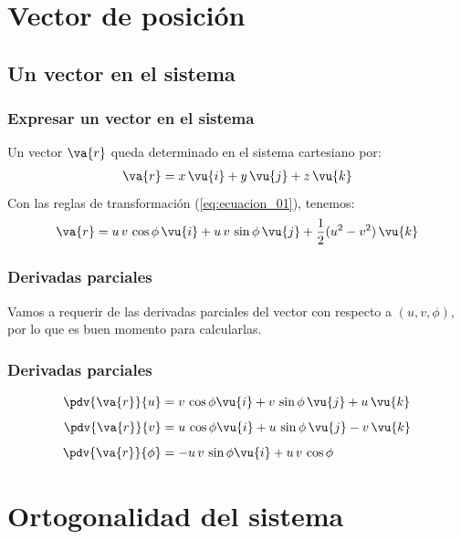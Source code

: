 \section{Vector de posición}
\subsection{Un vector en el sistema}
\begin{frame}
\frametitle{Expresar un vector en el sistema}
Un vector $\va{r}$ queda determinado en el sistema cartesiano por:
\begin{align*}
\va{r} = x \, \vu{i} + y \, \vu{j} + z \, \vu{k}
\end{align*}
\pause
Con las reglas de transformación (\ref{eq:ecuacion_01}), tenemos:
\begin{align*}
\va{r} = u \, v \, \cos \phi \, \vu{i} + u \, v \, \sin \phi \, \vu{j} + \dfrac{1}{2} (u^{2} - v^{2}) \, \vu{k}
\end{align*}
\end{frame}
\begin{frame}
\frametitle{Derivadas parciales}
Vamos a requerir de las derivadas parciales del vector con respecto a $(u, v, \phi)$, por lo que es buen momento para calcularlas.
\end{frame}
\begin{frame}
\frametitle{Derivadas parciales}
\begin{align}
\begin{aligned}
\pdv{\va{r}}{u} &= v \, \cos \phi \vu{i} + v \, \sin \phi \, \vu{j} + u \, \vu{k} \\[0.5em]
\pdv{\va{r}}{v} &= u \, \cos \phi \vu{i} + u \, \sin \phi \, \vu{j} - v \, \vu{k} \\[0.5em]
\pdv{\va{r}}{\phi} &= - u \, v \, \sin \phi \vu{i} + u \, v \, \cos \phi
\end{aligned}
\label{eq:ecuacion_04}
\end{align}
\end{frame}
\section{Ortogonalidad del sistema}
